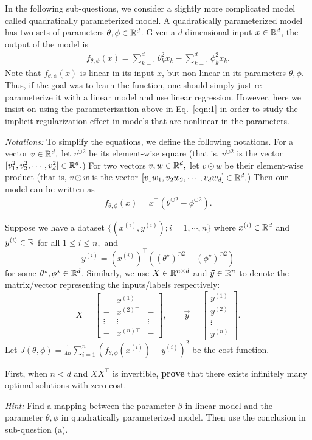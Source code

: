 \item{}
In the following sub-questions, we consider a slightly more complicated model called quadratically parameterized model. A quadratically parameterized model has two sets of parameters $\theta,\phi\in \mathbb{R}^{d}$. Given a $d$-dimensional input $x\in \mathbb{R}^{d}$, the output of the model is 
\begin{align}
	f_{\theta,\phi}(x)=\sum_{k=1}^{d}\theta_k^2 x_k - \sum_{k=1}^{d}\phi_k^2 x_k.\label{eqn:1}
\end{align}
Note that $f_{\theta,\phi}(x)$ is linear in its input $x$, but non-linear in its parameters $\theta,\phi.$ Thus, if the goal was to learn the function, one should simply just re-parameterize it with a linear model and use linear regression. However, here we insist on using the parameterization above in Eq.~\eqref{eqn:1} in order to study the implicit regularization effect in models that are nonlinear in the parameters.

\emph{Notations:} To simplify the equations, we define the following notations. For a vector $v\in \mathbb{R}^{d},$ let $v^{\odot 2}$ be its element-wise square (that is, $v^{\odot 2}$ is the vector $[v_1^2, v_2^2,\cdots, v_d^2]\in \mathbb{R}^{d}.$)  For two vectors $v,w\in \mathbb{R}^{d},$ let $v\odot w$ be their element-wise product (that is, $v\odot w$ is the vector $[v_1w_1,v_2w_2,\cdots,v_dw_d]\in \mathbb{R}^{d}.$) Then our model can be written as 
\begin{align}
	f_{\theta,\phi}(x)=x^\top (\theta^{\odot 2} -\phi^{\odot 2}).
\end{align}

Suppose we have a dataset $\{(x^{(i)}, y^{(i)});i=1,\cdots,n\}$ where $x^{(i)}\in \mathbb{R}^{d}$ and $y^{(i)}\in \mathbb{R}$ for all $1\le i\le n,$ and $$y^{(i)}=(x^{(i)})^\top ((\theta^\star)^{\odot 2}- (\phi^\star)^{\odot 2})$$ for some $\theta^\star, \phi^\star\in \mathbb{R}^{d}$.
Similarly, we use $X\in \mathbb{R}^{n\times d}$ and $\vec{y}\in \mathbb{R}^{n}$ to denote the matrix/vector representing the inputs/labels respectively:
$$
X=
\begin{bmatrix}
	- & x^{(1)\top} & - \\
	- & x^{(2)\top} & - \\
	\vdots & \vdots & \vdots\\
	- & x^{(n)\top} & - 
\end{bmatrix},\qquad
\vec{y}=
\begin{bmatrix}
	y^{(1)} \\
	y^{(2)}\\
	\vdots\\
	y^{(n)}
\end{bmatrix}.
$$
Let $J(\theta,\phi)=\frac{1}{4n}\sum_{i=1}^{n}(f_{\theta,\phi}(x^{(i)})-y^{(i)})^2$ be the cost function.

First, when $n<d$ and $XX^\top$ is invertible, \textbf{prove} that there exists infinitely many optimal solutions with zero cost.

\emph{Hint:} Find a mapping between the parameter $\beta$ in linear model and the parameter $\theta,\phi$ in quadratically parameterized model. Then use the conclusion in sub-question (a).